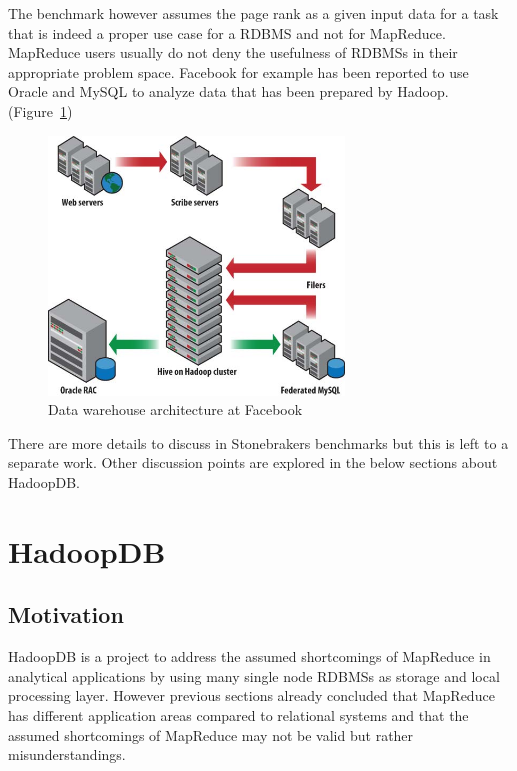 \documentclass[12pt,a4paper]{scrartcl}		%
\begin{document}
The benchmark however assumes the page rank as a given input data for a task that is indeed a proper use case for a RDBMS and not for MapReduce. MapReduce users usually do not deny the usefulness of RDBMSs in their appropriate problem space. Facebook for example has been reported to use Oracle and MySQL to analyze data that has been prepared by Hadoop. (Figure~\ref{fig:facebookdatawarehouse})

\begin{figure}[t]
  \centering
  \includegraphics[width=0.7\textwidth]{images/rdms_as_frontend.jpg}
  \caption{Data warehouse architecture at Facebook\cite[p. 508]{White201010}}
  \label{fig:facebookdatawarehouse}
\end{figure}

There are more details to discuss in Stonebrakers benchmarks but this is left to a separate work. Other discussion points are explored in the below sections about HadoopDB.

\section{HadoopDB}

\subsection{Motivation}

HadoopDB is a project to address the assumed shortcomings of MapReduce in analytical applications by using many single node RDBMSs as storage and local processing layer. However previous sections already concluded that MapReduce has different application areas compared to relational systems and that the assumed shortcomings of MapReduce may not be valid but rather misunderstandings.
\end{document}
